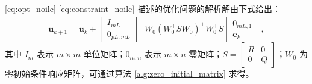 \begin{lemma}
	\label{lem:solution_noilc}
	\eqref{eq:opt_noilc} \eqref{eq:constraint_noilc} 描述的优化问题的解析解由下式给出：
	\begin{equation}
		\mathbf{u}_{k+1} = \mathbf{u}_k + \begin{bmatrix} I_{mL} \\ 0_{pL,mL} \end{bmatrix}^\top W_0 (W_0^\top S W_0)^+ W_0^\top S \begin{bmatrix} 0_{mL,1} \\ \mathbf{e}_k \end{bmatrix},
		\label{eq:solution_noilc}
	\end{equation}
	其中 \( I_m \) 表示 \( m \times m \) 单位矩阵；\( 0_{m,n} \) 表示 \( m \times n \) 零矩阵；\( S = \begin{bmatrix} R & 0 \\ 0 & Q \end{bmatrix} \)；\( W_0 \) 为零初始条件响应矩阵，可通过算法 \ref{alg:zero_initial_matrix} 求得。
\end{lemma}

